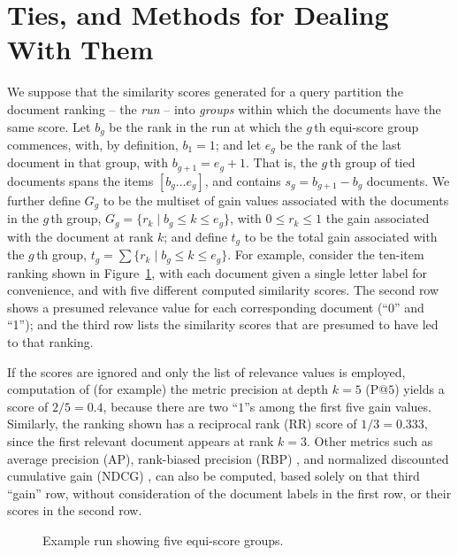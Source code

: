 \section{Ties, and Methods for Dealing With Them}
\label{sec-ties}


We suppose that the similarity scores generated for a query partition
the document ranking -- the {\emph{run}} -- into {\emph{groups}}
within which the documents have the same score.
Let $b_g$ be the rank in the run at which the $g$\,th equi-score
group commences, with, by definition, $b_1=1$; and let $e_g$ be the
rank of the last document in that group, with $b_{g+1}=e_g+1$.
That is, the $g$\,th group of tied documents spans the items
$[b_g\ldots e_g]$, and contains $s_g=b_{g+1}-b_g$ documents.
We further define $G_g$ to be the multiset of gain values associated
with the documents in the $g$\,th group,
	$G_g =\{r_k\mid b_g \le k \le e_g\}$, 
with $0\le r_k \le 1$ the gain associated with the document at rank $k$;
and define $t_g$
to be the total gain associated with the $g$\,th group,
	$t_g = \sum \{r_k\mid b_g \le k \le e_g\}$.
For example, consider the ten-item ranking shown in
Figure~\ref{fig-example}, with each document given a single letter
label for convenience, and with five different computed similarity
scores.
The second row shows a presumed relevance value for each
corresponding document (``$0$'' and ``1''); and the third row lists
the similarity scores that are presumed to have led to that ranking.

If the scores are ignored and only the list of relevance values is
employed, computation of (for example) the metric precision at depth
$k=5$ (P@$5$) yields a score of $2/5=0.4$, because there are two
``$1$''s among the first five gain values.
Similarly, the ranking shown has a reciprocal rank (RR) score of
$1/3=0.333$, since the first relevant document appears at rank $k=3$.
Other metrics such as average precision (AP), rank-biased precision
(RBP) {\citep{mz08acmtois}}, and normalized discounted cumulative
gain (NDCG) {\citep{jk02acmtois}}, can also be computed, based solely
on that third ``gain'' row, without consideration of the document
labels in the first row, or their scores in the second row.

\begin{figure}[t]
\centering

\caption{Example run showing five equi-score groups.
\label{fig-example}}
\end{figure}

